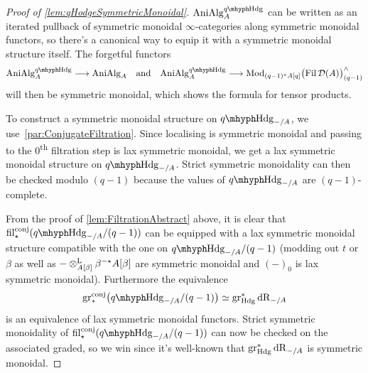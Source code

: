 \documentclass[DIV=12,numbers=enddot,leqno,bibliography=totoc]{scrartcl}
\begin{document}
	\begin{proof}[Proof of \cref{lem:qHodgeSymmetricMonoidal}]
		$\cat{AniAlg}_A^{\qHodge}$ can be written as an iterated pullback of symmetric monoidal $\infty$-categories along symmetric monoidal functors, so there's a canonical way to equip it with a symmetric monoidal structure itself. The forgetful functors
		\begin{equation*}
			\cat{AniAlg}_A^{\qHodge}\longrightarrow \cat{AniAlg}_A\quad\text{and}\quad\cat{AniAlg}_A^{\qHodge}\longrightarrow \Mod_{(q-1)^\star A[q]}\bigl( \Fil \Dd(A)\bigr)_{(q-1)}^\complete
		\end{equation*}
		will then be symmetric monoidal, which shows the formula for tensor products.
		
		To construct a symmetric monoidal structure on $\qHodge_{-/A}$, we use~\cref{par:ConjugateFiltration}. Since localising is symmetric monoidal and passing to the $0$\textsuperscript{th} filtration step is lax symmetric monoidal, we get a lax symmetric monoidal structure on $\qHodge_{-/A}$. Strict symmetric monoidality can then be checked modulo $(q-1)$ because the values of $\qHodge_{-/A}$ are $(q-1)$-complete. 
		
		From the proof of \cref{lem:FiltrationAbstract} above, it is clear that $ \fil_\star^\mathrm{conj}(\qHodge_{-/A}/(q-1))$ can be equipped with a lax symmetric monoidal structure compatible with the one on $\qHodge_{-/A}/(q-1)$ (modding out $t$ or $\beta$ as well as $-\otimes^{\mathrm{L}}_{A[\beta]}\beta^{-\star}A[\beta]$ are symmetric monoidal and $(-)_0$ is lax symmetric monoidal). Furthermore the equivalence
		\begin{equation*}
			\gr_*^\mathrm{conj}\bigl(\qHodge_{-/A}/(q-1)\bigr)\simeq \gr_{\Hodge}^*\deRham_{-/A}
		\end{equation*}
		is an equivalence of lax symmetric monoidal functors. Strict symmetric monoidality of $ \fil_\star^\mathrm{conj}(\qHodge_{-/A}/(q-1))$ can now be checked on the associated graded, so we win since it's well-known that $\operatorname{gr}_{\mathrm{Hdg}}^*\mathrm{dR}_{-/A}$ is symmetric monoidal.
	\end{proof}
\end{document}
